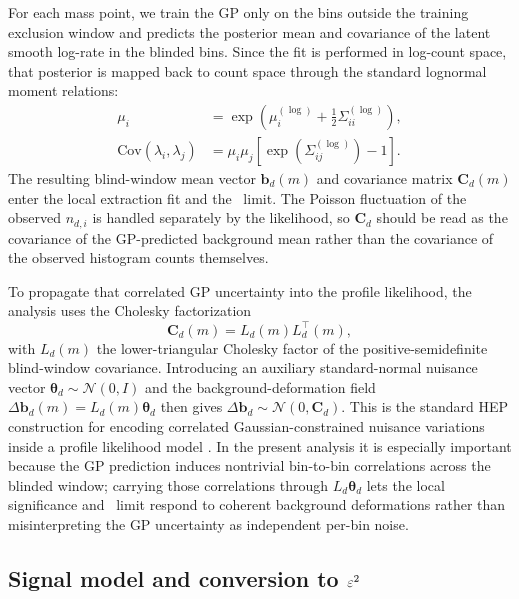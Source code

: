 For each mass point, we train the GP only on the bins outside the training
exclusion window and predicts the posterior mean and covariance of the latent smooth
log-rate in the blinded bins. Since the fit is performed in log-count space, that
posterior is mapped back to count space through the standard lognormal moment
relations:
\begin{align}
\mu_i &= \exp\!\left(\mu^{(\log)}_i + \frac{1}{2}\Sigma^{(\log)}_{ii}\right), \\
\mathrm{Cov}(\lambda_i,\lambda_j)
&= \mu_i\mu_j\left[\exp\!\left(\Sigma^{(\log)}_{ij}\right)-1\right].
\end{align}
The resulting blind-window mean vector $\bm{b}_d(m)$ and covariance matrix
$\bm{C}_d(m)$ enter the local extraction fit and the \CLs\ limit. The Poisson
fluctuation of the observed
$n_{d,i}$ is handled separately by the likelihood, so $\bm{C}_d$ should be read as the
covariance of the GP-predicted background mean rather than the covariance of the
observed histogram counts themselves.

To propagate that correlated GP uncertainty into the profile likelihood, the analysis
uses the Cholesky factorization
\begin{equation}
\bm{C}_d(m)=L_d(m)L_d^\top(m),
\label{eq:Cd-cholesky}
\end{equation}
with $L_d(m)$ the lower-triangular Cholesky factor of the positive-semidefinite
blind-window covariance. Introducing an auxiliary standard-normal nuisance vector
$\bm{\theta}_d\sim\mathcal{N}(0,I)$ and the background-deformation field
$\Delta\bm{b}_d(m)=L_d(m)\bm{\theta}_d$ then gives
$\Delta\bm{b}_d\sim\mathcal{N}(0,\bm{C}_d)$. This is the standard HEP construction for
encoding correlated Gaussian-constrained nuisance variations inside a profile
likelihood model \cite{HistFactory,Cowan2011}. In the present analysis it is
especially important because the GP prediction induces nontrivial bin-to-bin
correlations across the blinded window; carrying those correlations through
$L_d\bm{\theta}_d$ lets the local significance and \CLs\ limit respond to coherent
background deformations rather than misinterpreting the GP uncertainty as independent
per-bin noise.

\subsection{Signal model and conversion to \texorpdfstring{$\varepsilon^2$}{epsilon2}}


